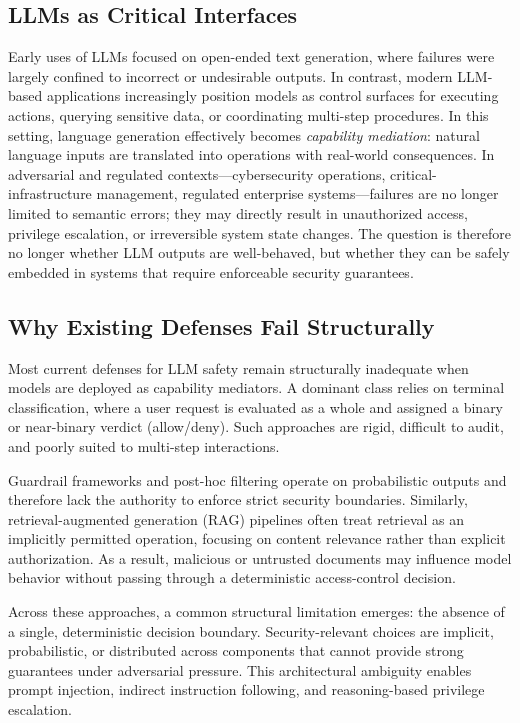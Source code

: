 \documentclass[conference]{IEEEtran}
\begin{document}
\subsection{LLMs as Critical Interfaces}
Early uses of LLMs focused on open-ended text generation, where failures
were largely confined to incorrect or undesirable outputs. In contrast,
modern LLM-based applications increasingly position models as control
surfaces for executing actions, querying sensitive data, or coordinating
multi-step procedures. In this setting, language generation effectively
becomes \emph{capability mediation}: natural language inputs are
translated into operations with real-world consequences. In adversarial
and regulated contexts---cybersecurity operations, critical-infrastructure
management, regulated enterprise systems---failures are no longer limited
to semantic errors; they may directly result in unauthorized access,
privilege escalation, or irreversible system state changes. The question
is therefore no longer whether LLM outputs are well-behaved, but whether
they can be safely embedded in systems that require enforceable security
guarantees.

\subsection{Why Existing Defenses Fail Structurally}
Most current defenses for LLM safety remain structurally inadequate when
models are deployed as capability mediators. A dominant class relies on
terminal classification, where a user request is evaluated as a whole and
assigned a binary or near-binary verdict (allow/deny). Such approaches are
rigid, difficult to audit, and poorly suited to multi-step interactions.

Guardrail frameworks and post-hoc filtering operate on probabilistic
outputs and therefore lack the authority to enforce strict security
boundaries. Similarly, retrieval-augmented generation (RAG) pipelines
often treat retrieval as an implicitly permitted operation, focusing on
content relevance rather than explicit authorization. As a result,
malicious or untrusted documents may influence model behavior without
passing through a deterministic access-control decision.

Across these approaches, a common structural limitation emerges: the
absence of a single, deterministic decision boundary. Security-relevant
choices are implicit, probabilistic, or distributed across components that
cannot provide strong guarantees under adversarial pressure. This
architectural ambiguity enables prompt injection, indirect instruction
following, and reasoning-based privilege escalation.
\end{document}

